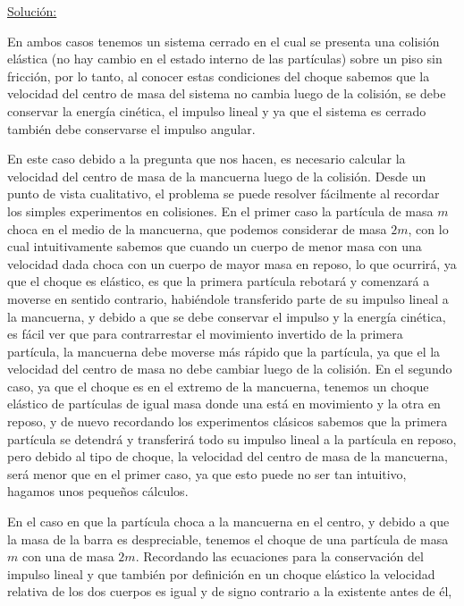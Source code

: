\documentclass[a4paper,10pt]{article}
\numberwithin{equation}{section}
\begin{document}
\vspace{.3cm}

\underline{Solución:} \vspace{.3cm}

En ambos casos tenemos un sistema cerrado en el cual se presenta una colisión 
elástica (no hay cambio en el estado interno de las partículas) sobre un piso sin
fricción, por lo tanto, al conocer estas condiciones del choque sabemos que la 
velocidad del centro de masa del sistema no cambia luego de la colisión, se 
debe conservar la energía cinética, el impulso lineal y ya que el sistema es 
cerrado también debe conservarse el impulso angular. 

\vspace{.3cm}

En este caso debido a la pregunta que nos hacen, es necesario calcular la 
velocidad del centro de masa de la mancuerna luego de la colisión. Desde un punto 
de vista cualitativo, el problema se puede resolver fácilmente al recordar los 
simples experimentos en colisiones. En el primer caso la partícula de masa 
$m$ choca en el medio de la mancuerna, que podemos considerar de masa $2m$, con 
lo cual intuitivamente sabemos que cuando un cuerpo de menor masa con una velocidad 
dada choca con un cuerpo de mayor masa en reposo, lo que ocurrirá, ya que el 
choque es elástico, es que la primera partícula rebotará y comenzará a moverse 
en sentido contrario, habiéndole transferido parte de su impulso lineal a la 
mancuerna, y debido a que se debe conservar el impulso y la energía cinética, 
es fácil ver que para contrarrestar el movimiento invertido de la primera partícula, 
la mancuerna debe moverse más rápido que la partícula, ya que el la velocidad del 
centro de masa no debe cambiar luego de la colisión. En el segundo caso, ya que 
el choque es en el extremo de la mancuerna, tenemos un choque elástico de 
partículas de igual masa donde una está en movimiento y la otra en reposo, y de 
nuevo recordando los experimentos clásicos sabemos que la primera partícula se 
detendrá y transferirá todo su impulso lineal a la partícula en reposo, pero debido 
al tipo de choque, la velocidad del centro de masa de la mancuerna, será menor 
que en el primer caso, ya que esto puede no ser tan intuitivo, hagamos unos pequeños 
cálculos.

\vspace{.3cm}

En el caso en que la partícula choca a la mancuerna en el centro, y debido a que 
la masa de la barra es despreciable, tenemos el choque de una partícula de masa $m$ con una 
de masa $2m$. Recordando las ecuaciones para la conservación del impulso lineal y que 
también por definición en un choque elástico la velocidad relativa de los dos cuerpos 
es igual y de signo contrario a la existente antes de él, 
\end{document}
